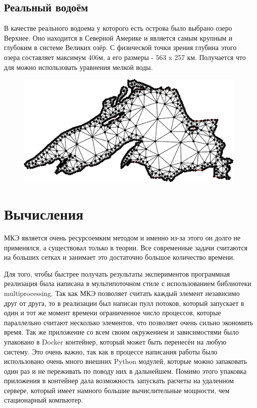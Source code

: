 \documentclass[14pt]{extreport}
\begin{document}
\subsection{Реальный водоём}
В качестве реального водоема у которого есть острова было выбрано озеро Верхнее. Оно находится в Северной Америке и является самым крупным и глубоким в системе Великих озёр. С физической точки зрения глубина этого озера составляет максимум 406м, а его размеры - 563 x 257 км. Получается что для можно использовать уравнения мелкой воды.

\begin{figure}[H]
\centerline{
\includegraphics[width=1.0\linewidth]{images/ex4/mesh}}
\caption{}
\label{img:ex4:mesh}
\end{figure}





\section{Вычисления}

МКЭ является очень ресурсоемким методом и именно из-за этого он долго не применялся, а существовал только в теории. Все современные задачи считаются на больших сетках и занимает это достаточно большое количество времени.

Для того, чтобы быстрее получать результаты экспериментов программная реализация была написана в мультипоточном стиле с использованием библиотеки multiprocessing. Так как МКЭ позволяет считать каждый элемент независимо друг от друга, то в реализации был написан пулл потоков, который запускает в один и тот же момент времени ограниченное число процессов, которые параллельно считают несколько элементов, что позволяет очень сильно экономить время. Так же приложение со всем своим окружением и зависимостями было упаковано в Docker контейнер, который может быть перенесён на любую систему. Это очень важно, так как в процессе написания работы было использовано очень много внешних Python модулей, которые можно запаковать один раз и не переживать по поводу них в дальнейшем. Помимо этого упаковка приложения в контейнер дала возможность запускать расчеты на удаленном сервере, который имеет намного большие вычислительные мощности, чем стационарный компьютер.
\end{document}
